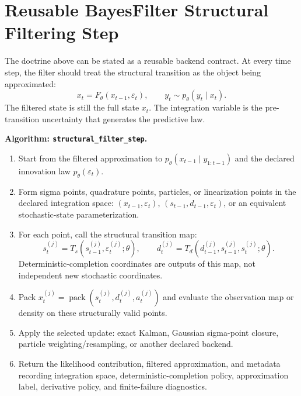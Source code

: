 \section{Reusable BayesFilter Structural Filtering Step}
\label{sec:bf-structural-filter-step-algorithm}

The doctrine above can be stated as a reusable backend contract.  At every time
step, the filter should treat the structural transition as the object being
approximated:
\[
  x_t = F_\theta(x_{t-1},\varepsilon_t),
  \qquad
  y_t \sim p_\theta(y_t\mid x_t).
\]
The filtered state is still the full state $x_t$.  The integration variable is
the pre-transition uncertainty that generates the predictive law.

\begin{mdframed}
\textbf{Algorithm: \texttt{structural\_filter\_step}.}

\begin{enumerate}[label=(\arabic*)]
  \item Start from the filtered approximation to
    $p_\theta(x_{t-1}\mid y_{1:t-1})$ and the declared innovation law
    $p_\theta(\varepsilon_t)$.
  \item Form sigma points, quadrature points, particles, or linearization
    points in the declared integration space:
    $(x_{t-1},\varepsilon_t)$, $(s_{t-1},d_{t-1},\varepsilon_t)$, or an
    equivalent stochastic-state parameterization.
  \item For each point, call the structural transition map:
    \[
      s_t^{(j)}=T_s(s_{t-1}^{(j)},\varepsilon_t^{(j)};\theta),
      \qquad
      d_t^{(j)}=T_d(d_{t-1}^{(j)},s_{t-1}^{(j)},s_t^{(j)};\theta).
    \]
    Deterministic-completion coordinates are outputs of this map, not
    independent new stochastic coordinates.
  \item Pack $x_t^{(j)}=\operatorname{pack}(s_t^{(j)},d_t^{(j)},a_t^{(j)})$
    and evaluate the observation map or density on these structurally valid
    points.
  \item Apply the selected update: exact Kalman, Gaussian sigma-point closure,
    particle weighting/resampling, or another declared backend.
  \item Return the likelihood contribution, filtered approximation, and
    metadata recording integration space, deterministic-completion policy,
    approximation label, derivative policy, and finite-failure diagnostics.
\end{enumerate}
\end{mdframed}


